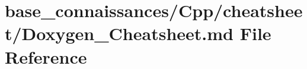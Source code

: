 \hypertarget{base__connaissances_2Cpp_2cheatsheet_2Doxygen__Cheatsheet_8md}{}\section{base\+\_\+connaissances/\+Cpp/cheatsheet/\+Doxygen\+\_\+\+Cheatsheet.md File Reference}
\label{base__connaissances_2Cpp_2cheatsheet_2Doxygen__Cheatsheet_8md}
